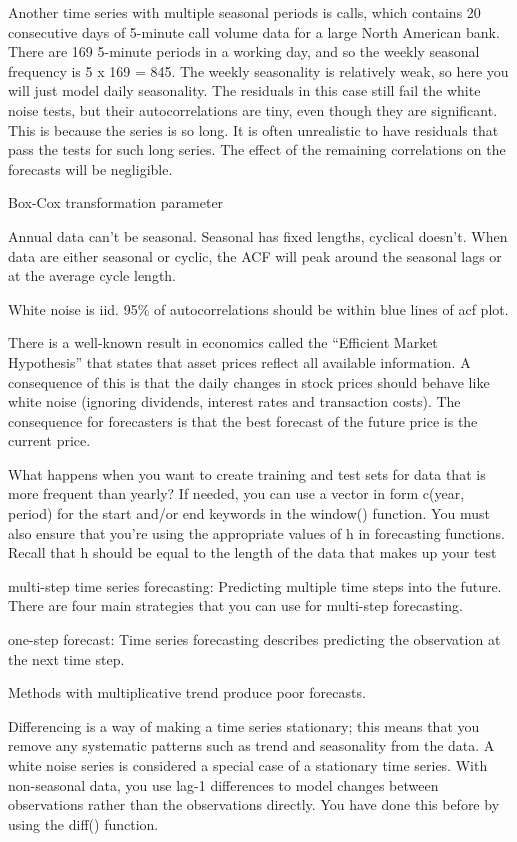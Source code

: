 \documentclass[]{book}
\begin{document}
Another time series with multiple seasonal periods is calls, which
contains 20 consecutive days of 5-minute call volume data for a large
North American bank. There are 169 5-minute periods in a working day,
and so the weekly seasonal frequency is 5 x 169 = 845. The weekly
seasonality is relatively weak, so here you will just model daily
seasonality. The residuals in this case still fail the white noise
tests, but their autocorrelations are tiny, even though they are
significant. This is because the series is so long. It is often
unrealistic to have residuals that pass the tests for such long series.
The effect of the remaining correlations on the forecasts will be
negligible.

Box-Cox transformation parameter

Annual data can't be seasonal. Seasonal has fixed lengths, cyclical
doesn't. When data are either seasonal or cyclic, the ACF will peak
around the seasonal lags or at the average cycle length.

White noise is iid. 95\% of autocorrelations should be within blue lines
of acf plot.

There is a well-known result in economics called the ``Efficient Market
Hypothesis'' that states that asset prices reflect all available
information. A consequence of this is that the daily changes in stock
prices should behave like white noise (ignoring dividends, interest
rates and transaction costs). The consequence for forecasters is that
the best forecast of the future price is the current price.

What happens when you want to create training and test sets for data
that is more frequent than yearly? If needed, you can use a vector in
form c(year, period) for the start and/or end keywords in the window()
function. You must also ensure that you're using the appropriate values
of h in forecasting functions. Recall that h should be equal to the
length of the data that makes up your test

multi-step time series forecasting: Predicting multiple time steps into
the future. There are four main strategies that you can use for
multi-step forecasting.

one-step forecast: Time series forecasting describes predicting the
observation at the next time step.

Methods with multiplicative trend produce poor forecasts.

Differencing is a way of making a time series stationary; this means
that you remove any systematic patterns such as trend and seasonality
from the data. A white noise series is considered a special case of a
stationary time series. With non-seasonal data, you use lag-1
differences to model changes between observations rather than the
observations directly. You have done this before by using the diff()
function.
\end{document}
